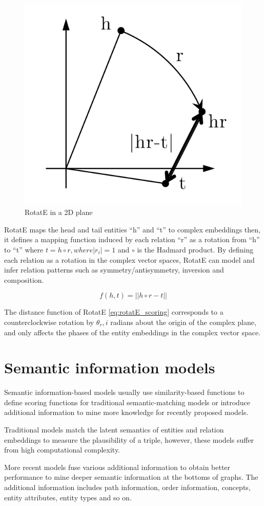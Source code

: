 \begin{figure}[!htp]
    \centering
    \includegraphics[width=.4\textwidth]{fig/embeddings/RotatE.png}
    \caption{RotatE \cite{sun2019rotate} in a 2D plane}
    \label{fig:emb-rotatE}
\end{figure}

RotatE maps the head and tail entities ``h'' and ``t'' to complex embeddings then, it defines a mapping function induced by each relation ``r'' as a rotation from ``h'' to ``t'' where $t = h \circ r, where |r_i| = 1$ and $\circ$ is the Hadmard product.
By defining each relation as a rotation in the complex vector spaces, RotatE can model and infer relation patterns such as symmetry/antisymmetry, inversion and composition. 

\begin{equation}
    \label{eq:rotatE_scoring}
    f(h, t) = ||h \circ r - t||
\end{equation}

The distance function of RotatE \ref{eq:rotatE_scoring} corresponds to a counterclockwise rotation by $\theta_r,i$ radians about the origin of the complex plane, and only affects the phases of the entity embeddings in the complex vector space.

\section{Semantic information models}\label{sec:emb-semantic}
Semantic information-based models usually use similarity-based functions to define scoring functions for traditional semantic-matching models or introduce additional information to mine more knowledge for recently proposed models.

Traditional models match the latent semantics of entities and relation embeddings to measure the plausibility of a triple, however, these models suffer from high computational complexity.

More recent models fuse various additional information to obtain better performance to mine deeper semantic information at the bottoms of graphs. The additional information includes path information, order information, concepts, entity attributes, entity types and so on.

